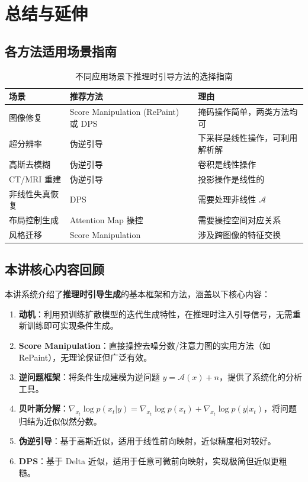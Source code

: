 \section{总结与延伸}

\subsection{各方法适用场景指南}

\begin{table}[H]
\centering
\begin{tabular}{p{}p{}p{}}
\toprule
\textbf{场景} & \textbf{推荐方法} & \textbf{理由} \\
\midrule
图像修复 & Score Manipulation (RePaint) 或 DPS & 掩码操作简单，两类方法均可 \\
超分辨率 & 伪逆引导 & 下采样是线性操作，可利用解析解 \\
高斯去模糊 & 伪逆引导 & 卷积是线性操作 \\
CT/MRI 重建 & 伪逆引导 & 投影操作是线性的 \\
非线性失真恢复 & DPS & 需要处理非线性 $\mathcal{A}$ \\
布局控制生成 & Attention Map 操控 & 需要操控空间对应关系 \\
风格迁移 & Score Manipulation & 涉及跨图像的特征交换 \\
\bottomrule
\end{tabular}
\caption{不同应用场景下推理时引导方法的选择指南}
\end{table}

\subsection{本讲核心内容回顾}

本讲系统介绍了\textbf{推理时引导生成}的基本框架和方法，涵盖以下核心内容：

\begin{enumerate}
    \item \textbf{动机}：利用预训练扩散模型的迭代生成特性，在推理时注入引导信号，无需重新训练即可实现条件生成。
    \item \textbf{Score Manipulation}：直接操控去噪分数/注意力图的实用方法（如 RePaint），无理论保证但广泛有效。
    \item \textbf{逆问题框架}：将条件生成建模为逆问题 $y = \mathcal{A}(x) + n$，提供了系统化的分析工具。
    \item \textbf{贝叶斯分解}：$\nabla_{x_t} \log p(x_t|y) = \nabla_{x_t} \log p(x_t) + \nabla_{x_t} \log p(y|x_t)$，将问题归结为近似似然分数。
    \item \textbf{伪逆引导}：基于高斯近似，适用于线性前向映射，近似精度相对较好。
    \item \textbf{DPS}：基于 Delta 近似，适用于任意可微前向映射，实现极简但近似更粗糙。
\end{enumerate}

